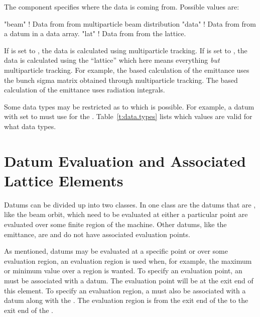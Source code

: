 The  component specifies where the data is 
coming from. Possible values are:
\begin{example}
  "beam"        ! Data from from multiparticle beam distribution
  "data"        ! Data from from a \tao datum in a data array.
  "lat"         ! Data from from the lattice.
\end{example}
If  is set to , the data is calculated
using multiparticle tracking.  If  is set to
, the data is calculated using the ``lattice'' which here
means everything {\em but} multiparticle tracking.  For example, the
 based calculation of the emittance uses the bunch sigma
matrix obtained through multiparticle tracking. The  based
calculation of the emittance uses radiation integrals.

Some data types may be restricted as to which  is
possible. For example, a datum with  set to
 must use  for the . 
Table~\ref{t:data.types} lists which  values are valid
for what data types.

\section{Datum Evaluation and Associated Lattice Elements}
\label{s:data.lat.ele}

Datums can be divided up into two classes. In one class are the datums
that are , like the beam orbit, which need to be evaluated at
either a particular point are evaluated over some finite region of the
machine. Other datums, like the emittance, are  and do not
have associated evaluation points.

As mentioned,  datums may be evaluated at a specific point
or over some evaluation region, an evaluation region is used when, for
example, the maximum or minimum value over a region is wanted. To
specify an evaluation point, an  must be
associated with a datum. The evaluation point will be at the exit end
of this element. To specify an evaluation region, a 
must also be associated with a datum along with the . The evaluation region is from the exit end of the  to the exit end of the .

